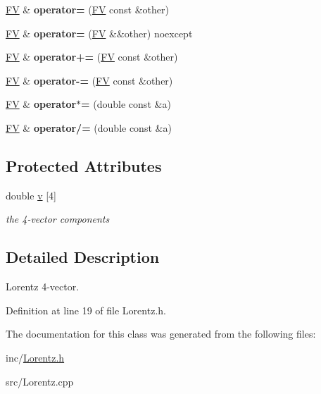 \begin{DoxyCompactItemize}
\item 
\hypertarget{classFV_aa7bad77e8a25ff4d3d769a544eccf314}{\hyperlink{classFV}{F\-V} \& {\bfseries operator=} (\hyperlink{classFV}{F\-V} const \&other)}\label{classFV_aa7bad77e8a25ff4d3d769a544eccf314}

\item 
\hypertarget{classFV_ac95050de7df77088ad31b1c755e2fe33}{\hyperlink{classFV}{F\-V} \& {\bfseries operator=} (\hyperlink{classFV}{F\-V} \&\&other) noexcept}\label{classFV_ac95050de7df77088ad31b1c755e2fe33}

\item 
\hypertarget{classFV_ac30a0c8c757d2e5dbd74131f569f48db}{\hyperlink{classFV}{F\-V} \& {\bfseries operator+=} (\hyperlink{classFV}{F\-V} const \&other)}\label{classFV_ac30a0c8c757d2e5dbd74131f569f48db}

\item 
\hypertarget{classFV_a32a55d4f37e616b0b043282a201aa0f6}{\hyperlink{classFV}{F\-V} \& {\bfseries operator-\/=} (\hyperlink{classFV}{F\-V} const \&other)}\label{classFV_a32a55d4f37e616b0b043282a201aa0f6}

\item 
\hypertarget{classFV_ac50969de8023081218ac2480f4403a4d}{\hyperlink{classFV}{F\-V} \& {\bfseries operator$\ast$=} (double const \&a)}\label{classFV_ac50969de8023081218ac2480f4403a4d}

\item 
\hypertarget{classFV_a8d74f60b130edb26fd62c590ea5ecfce}{\hyperlink{classFV}{F\-V} \& {\bfseries operator/=} (double const \&a)}\label{classFV_a8d74f60b130edb26fd62c590ea5ecfce}

\end{DoxyCompactItemize}
\subsection*{Protected Attributes}
\begin{DoxyCompactItemize}
\item 
\hypertarget{classFV_a909196132ec1cd190f8c01546ea5bced}{double \hyperlink{classFV_a909196132ec1cd190f8c01546ea5bced}{v} \mbox{[}4\mbox{]}}\label{classFV_a909196132ec1cd190f8c01546ea5bced}

\begin{DoxyCompactList}\small\item\em the 4-\/vector components \end{DoxyCompactList}\end{DoxyCompactItemize}


\subsection{Detailed Description}
Lorentz 4-\/vector. 

Definition at line 19 of file Lorentz.\-h.



The documentation for this class was generated from the following files\-:\begin{DoxyCompactItemize}
\item 
inc/\hyperlink{Lorentz_8h}{Lorentz.\-h}\item 
src/Lorentz.\-cpp\end{DoxyCompactItemize}

